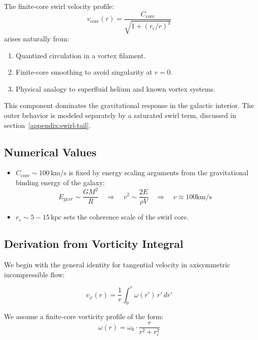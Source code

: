 \documentclass[12pt]{article}
\begin{document}
The finite-core swirl velocity profile:
\[
\boxed{
v_\text{core}(r) = \frac{C_{\text{core}}}{\sqrt{1 + (r_c/r)^2}}
}
\]
arises naturally from:
\begin{enumerate}
    \item Quantized circulation in a vortex filament.
    \item Finite-core smoothing to avoid singularity at \( r = 0 \).
    \item Physical analogy to superfluid helium and known vortex systems.
\end{enumerate}

This component dominates the gravitational response in the galactic interior. The outer behavior is modeled separately by a saturated swirl term, discussed in section~\ref{appendix:swirl-tail}.

\subsection{Numerical Values}

\begin{itemize}
    \item \( C_{\text{core}} \sim 100\,\text{km/s} \) is fixed by energy scaling arguments from the gravitational binding energy of the galaxy:
    \[
    E_{\text{grav}} \sim \frac{GM^2}{R} \quad \Rightarrow \quad v^2 \sim \frac{2E}{\rho V} \quad \Rightarrow \quad v \approx 100 \text{km/s}
    \]
    \item \( r_c \sim 5 - 15\,\text{kpc} \) sets the coherence scale of the swirl core.
\end{itemize}

\subsection{Derivation from Vorticity Integral}

We begin with the general identity for tangential velocity in axisymmetric incompressible flow:

\begin{equation}
    v_\varphi(r) = \frac{1}{r} \int_0^r \omega(r') \, r' \, dr'
    \label{eq:v_from_omega}
\end{equation}

We assume a finite-core vorticity profile of the form:
\begin{equation}
    \omega(r) = \omega_0 \cdot \frac{r}{r^2 + r_c^2}
    \label{eq:vorticity_profile}
\end{equation}
\end{document}
